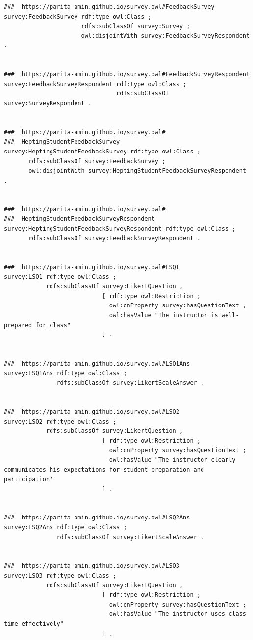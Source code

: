 \begin{lstlisting}
###  https://parita-amin.github.io/survey.owl#FeedbackSurvey
survey:FeedbackSurvey rdf:type owl:Class ;
                      rdfs:subClassOf survey:Survey ;
                      owl:disjointWith survey:FeedbackSurveyRespondent .


###  https://parita-amin.github.io/survey.owl#FeedbackSurveyRespondent
survey:FeedbackSurveyRespondent rdf:type owl:Class ;
                                rdfs:subClassOf survey:SurveyRespondent .


###  https://parita-amin.github.io/survey.owl#
###	 HeptingStudentFeedbackSurvey
survey:HeptingStudentFeedbackSurvey rdf:type owl:Class ;
       rdfs:subClassOf survey:FeedbackSurvey ;
       owl:disjointWith survey:HeptingStudentFeedbackSurveyRespondent .


###  https://parita-amin.github.io/survey.owl#
###	 HeptingStudentFeedbackSurveyRespondent
survey:HeptingStudentFeedbackSurveyRespondent rdf:type owl:Class ;
       rdfs:subClassOf survey:FeedbackSurveyRespondent .


###  https://parita-amin.github.io/survey.owl#LSQ1
survey:LSQ1 rdf:type owl:Class ;
            rdfs:subClassOf survey:LikertQuestion ,
                            [ rdf:type owl:Restriction ;
                              owl:onProperty survey:hasQuestionText ;
                              owl:hasValue "The instructor is well-prepared for class"
                            ] .


###  https://parita-amin.github.io/survey.owl#LSQ1Ans
survey:LSQ1Ans rdf:type owl:Class ;
               rdfs:subClassOf survey:LikertScaleAnswer .


###  https://parita-amin.github.io/survey.owl#LSQ2
survey:LSQ2 rdf:type owl:Class ;
            rdfs:subClassOf survey:LikertQuestion ,
                            [ rdf:type owl:Restriction ;
                              owl:onProperty survey:hasQuestionText ;
                              owl:hasValue "The instructor clearly communicates his expectations for student preparation and participation"
                            ] .


###  https://parita-amin.github.io/survey.owl#LSQ2Ans
survey:LSQ2Ans rdf:type owl:Class ;
               rdfs:subClassOf survey:LikertScaleAnswer .


###  https://parita-amin.github.io/survey.owl#LSQ3
survey:LSQ3 rdf:type owl:Class ;
            rdfs:subClassOf survey:LikertQuestion ,
                            [ rdf:type owl:Restriction ;
                              owl:onProperty survey:hasQuestionText ;
                              owl:hasValue "The instructor uses class time effectively"
                            ] .



\end{lstlisting}
